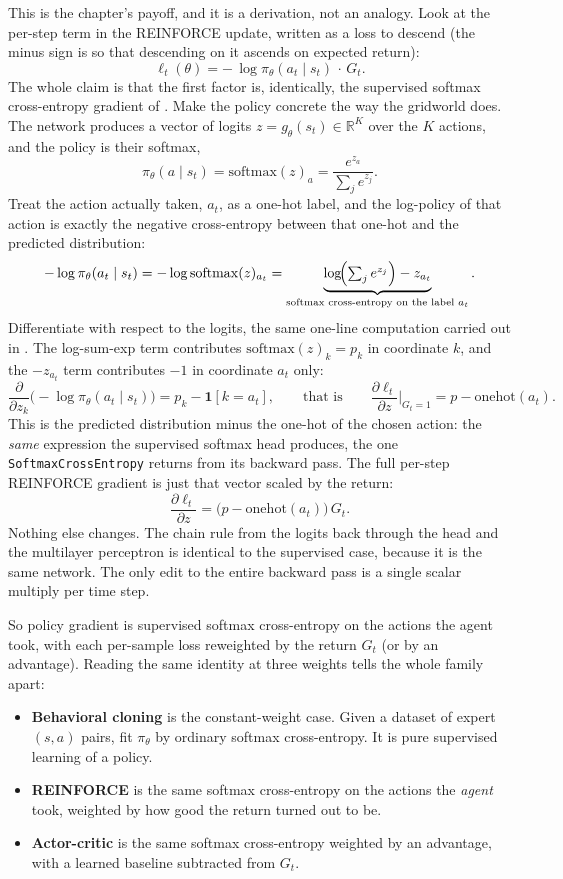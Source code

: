 This is the chapter's payoff, and it is a derivation, not an analogy. Look at
the per-step term in the REINFORCE update, written as a loss to descend (the
minus sign is so that descending on it ascends on expected return):
\[
  \ell_t(\theta) = -\,\log \pi_\theta(a_t \mid s_t)\, \cdot\, G_t.
\]
The whole claim is that the first factor is, identically, the supervised
softmax cross-entropy gradient of . Make the policy concrete
the way the gridworld does. The network produces a vector of logits $z =
g_\theta(s_t) \in \mathbb{R}^K$ over the $K$ actions, and the policy is their
softmax,
\[
  \pi_\theta(a \mid s_t) = \mathrm{softmax}(z)_a
    = \frac{e^{z_a}}{\sum_{j} e^{z_j}}.
\]
Treat the action actually taken, $a_t$, as a one-hot label, and the
log-policy of that action is exactly the negative cross-entropy between that
one-hot and the predicted distribution:
\[
  -\log \pi_\theta(a_t \mid s_t)
    = -\log \mathrm{softmax}(z)_{a_t}
    = \underbrace{\log\!\Bigl(\textstyle\sum_j e^{z_j}\Bigr) - z_{a_t}}
              _{\text{softmax cross-entropy on the label } a_t}.
\]
Differentiate with respect to the logits, the same one-line computation
carried out in . The log-sum-exp term contributes
$\mathrm{softmax}(z)_k = p_k$ in coordinate $k$, and the $-z_{a_t}$ term
contributes $-1$ in coordinate $a_t$ only:
\[
  \frac{\partial}{\partial z_k}\bigl(-\log \pi_\theta(a_t \mid s_t)\bigr)
    = p_k - \mathbf{1}[k = a_t],
  \qquad\text{that is}\qquad
  \frac{\partial \ell_t}{\partial z}\bigg|_{G_t = 1}
    = p - \mathrm{onehot}(a_t).
\]
This is the predicted distribution minus the one-hot of the chosen action: the
\emph{same} expression the supervised softmax head produces, the one
\texttt{SoftmaxCrossEntropy} returns from its backward pass. The full
per-step REINFORCE gradient is just that vector scaled by the return:
\[
  \frac{\partial \ell_t}{\partial z}
    = \bigl(p - \mathrm{onehot}(a_t)\bigr)\, G_t.
\]
Nothing else changes. The chain rule from the logits back through the head and
the multilayer perceptron is identical to the supervised case, because it is
the same network. The only edit to the entire backward pass is a single scalar
multiply per time step.

So policy gradient is supervised softmax cross-entropy on the actions the
agent took, with each per-sample loss reweighted by the return $G_t$ (or by an
advantage). Reading the same identity at three weights tells the whole family
apart:

\begin{itemize}
\item \textbf{Behavioral cloning} is the constant-weight case. Given a dataset
of expert $(s, a)$ pairs, fit $\pi_\theta$ by ordinary softmax cross-entropy.
It is pure supervised learning of a policy.
\item \textbf{REINFORCE} is the same softmax cross-entropy on the actions the
\emph{agent} took, weighted by how good the return turned out to be.
\item \textbf{Actor-critic} is the same softmax cross-entropy weighted by an
advantage, with a learned baseline subtracted from $G_t$.
\end{itemize}

